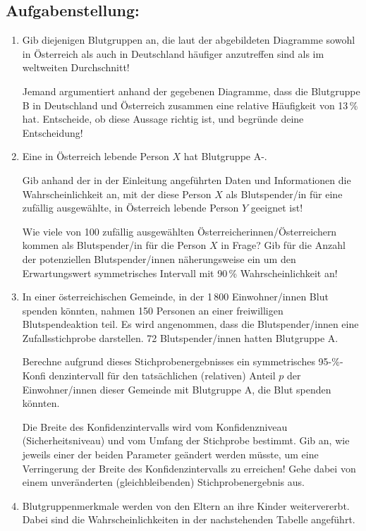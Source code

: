 \begin{langesbeispiel}
\subsection{Aufgabenstellung:}
\begin{enumerate}
	\item {}  Gib diejenigen Blutgruppen an, die laut der abgebildeten Diagramme sowohl in Österreich als auch in Deutschland häufiger anzutreffen sind als im weltweiten Durchschnitt! 
	
	 Jemand argumentiert anhand der gegebenen Diagramme, dass die Blutgruppe B in Deutschland und Österreich zusammen eine relative Häufigkeit von 13\,\% hat.  Entscheide, ob diese Aussage richtig ist, und begründe deine Entscheidung!


\item  Eine in Österreich lebende Person $X$ hat Blutgruppe A-.

 Gib anhand der in der Einleitung angeführten Daten und Informationen die Wahrscheinlichkeit an, mit der diese Person $X$ als Blutspender/in für eine zufällig ausgewählte, in Österreich lebende Person $Y$ geeignet ist!

  Wie viele von 100 zufällig ausgewählten Österreicherinnen/Österreichern kommen als Blutspender/in für die Person $X$ in Frage? Gib für die Anzahl der potenziellen Blutspender/innen näherungsweise ein um den Erwartungswert symmetrisches Intervall mit 90\,\% Wahrscheinlichkeit an!

\item In einer österreichischen Gemeinde, in der 1\,800 Einwohner/innen Blut spenden könnten, nahmen 150 Personen an einer freiwilligen Blutspendeaktion teil. Es wird angenommen, dass die Blutspender/innen eine Zufallsstichprobe darstellen. 72 Blutspender/innen hatten Blutgruppe A.

 Berechne aufgrund dieses Stichprobenergebnisses ein symmetrisches 95-\%-Konfi denzintervall für den tatsächlichen (relativen) Anteil $p$ der Einwohner/innen dieser Gemeinde mit Blutgruppe A, die Blut spenden könnten.

Die Breite des Konfidenzintervalls wird vom Konfidenzniveau (Sicherheitsniveau) und vom Umfang der Stichprobe bestimmt. Gib an, wie jeweils einer der beiden Parameter geändert werden müsste, um eine Verringerung der Breite des Konfidenzintervalls zu erreichen! Gehe dabei von einem unveränderten (gleichbleibenden) Stichprobenergebnis aus.

\item  Blutgruppenmerkmale werden von den Eltern an ihre Kinder weitervererbt. Dabei sind die  Wahrscheinlichkeiten in der nachstehenden Tabelle angeführt.\leer


\end{enumerate}
\end{langesbeispiel}
